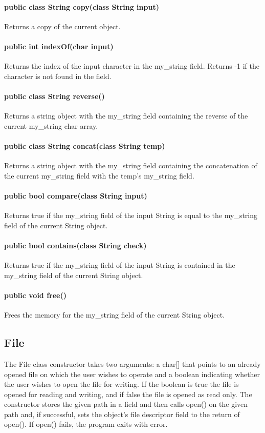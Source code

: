 \begin{homeworkProblem}
	\paragraph{public class String copy(class String input)}
	Returns a copy of the current object.
	\paragraph{public int indexOf(char input)}
	Returns the index of the input character in the my\_string field. Returns -1 if the character is not found in the field.
	\paragraph{public class String reverse()}
	Returns a string object with the my\_string field containing the reverse of the current my\_string char array.
	\paragraph{public class String concat(class String temp)}
	Returns a string object with the my\_string field containing the concatenation of the current my\_string field with the temp's my\_string field.
	\paragraph{public bool compare(class String input)}
	Returns true if the my\_string field of the input String is equal to the my\_string field of the current String object.
	\paragraph{public bool contains(class String check)}
	Returns true if the my\_string field of the input String is contained in the my\_string field of the current String object.
	\paragraph{public void free()}
	Frees the memory for the my\_string field of the current String object.
	
	\subsection{File}
	The File class constructor takes two arguments: a char[] that points to an already opened file on which the user wishes to operate and a boolean indicating whether the user wishes to open the file for writing. If the boolean is true the file is opened for reading and writing, and if false the file is opened as read only. The constructor stores the given path in a field and then calls open() on the given path and, if successful, sets the object's file descriptor field to the return of open(). If open() fails, the program exits with error.

\end{homeworkProblem}
